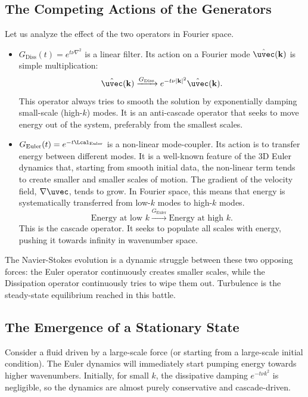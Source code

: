 \subsection{The Competing Actions of the Generators}

Let us analyze the effect of the two operators in Fourier space.
\begin{itemize}
    \item $G_{\text{Diss}}(t) = e^{t\nu\nabla^2}$ is a linear filter. Its action on a Fourier mode $\hat{\uvec}(\mathbf{k})$ is simple multiplication:
    \begin{equation}
        \hat{\uvec}(\mathbf{k}) \xrightarrow{G_{\text{Diss}}} e^{-t\nu|\mathbf{k}|^2} \hat{\uvec}(\mathbf{k}).
    \end{equation}
    This operator always tries to smooth the solution by exponentially damping small-scale (high-$k$) modes. It is an anti-cascade operator that seeks to move energy out of the system, preferably from the smallest scales.

    \item $G_{\text{Euler}}(t) = e^{-t\Lcal_{\text{Euler}}}$ is a non-linear mode-coupler. Its action is to transfer energy between different modes. It is a well-known feature of the 3D Euler dynamics that, starting from smooth initial data, the non-linear term tends to create smaller and smaller scales of motion. The gradient of the velocity field, $\nabla\uvec$, tends to grow. In Fourier space, this means that energy is systematically transferred from low-$k$ modes to high-$k$ modes.
    \begin{equation}
        \text{Energy at low } k \xrightarrow{G_{\text{Euler}}} \text{Energy at high } k.
    \end{equation}
    This is the cascade operator. It seeks to populate all scales with energy, pushing it towards infinity in wavenumber space.
\end{itemize}

The Navier-Stokes evolution is a dynamic struggle between these two opposing forces: the Euler operator continuously creates smaller scales, while the Dissipation operator continuously tries to wipe them out. Turbulence is the steady-state equilibrium reached in this battle.

\subsection{The Emergence of a Stationary State}

Consider a fluid driven by a large-scale force (or starting from a large-scale initial condition). The Euler dynamics will immediately start pumping energy towards higher wavenumbers. Initially, for small $k$, the dissipative damping $e^{-t\nu k^2}$ is negligible, so the dynamics are almost purely conservative and cascade-driven.

